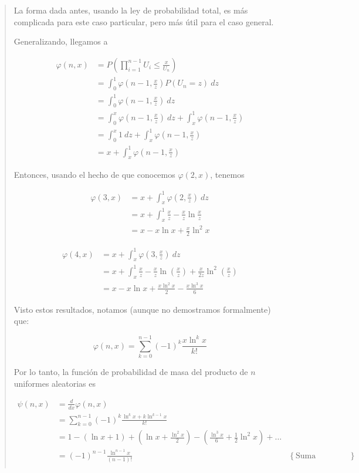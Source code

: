 \documentclass[a4paper, 12pt]{article}
\begin{document}
\begin{quote}
\begin{myframe}
La forma dada antes, usando la ley de probabilidad total, es más complicada para
este caso particular, pero más útil para el caso general.
\end{myframe}

Generalizando, llegamos a

\begin{align*}
  \varphi(n, x) 
  &= P\left(\prod_{i=1}^{n-1} U_i \leq \frac{x}{U_n}\right)  \\ 
  &= \int_0^1 \varphi\left(n-1, \frac{x}{z}\right) P(U_n = z) ~ dz \\ 
  &=\int_0^1 \varphi\left(n-1, \frac{x}{z}\right) ~ dz \\ 
  &=\int_0^x \varphi \left( n - 1, \frac{x}{z} \right) ~ dz + \int_x^1 \varphi
  \left( n - 1, \frac{x}{z} \right) \\ 
  &= \int_0^x 1 ~ dz + \int_x^{1} \varphi\left( n-1, \frac{x}{z} \right)  \\ 
  &= x + \int_x^1 \varphi\left( n-1, \frac{x}{z} \right) 
\end{align*}

Entonces, usando el hecho de que conocemos $\varphi(2, x)$, tenemos 

\begin{align*}
  \varphi(3, x) 
  &= x + \int_x^1 \varphi(2, \frac{x}{z}) ~ dz  \\ 
  &=x + \int_x^1 \frac{x}{z}-\frac{x}{z} \ln \frac{x}{z} \\ 
  &= x - x\ln x + \frac{x}{2} \ln^2 x
\end{align*}

\begin{align*}
  \varphi(4, x) 
  &= x + \int_x^1 \varphi(3, \frac{x}{z}) ~ dz  \\ 
  &=
  x + \int_x^1 \frac{x}{z} -\frac{x}{z} \ln\left( \frac{x}{z} \right) + \frac{x}{2z} \ln^2 \left( \frac{x}{z} \right)   \\ 
  &=x - x \ln x + \frac{x \ln^2 x}{2} - \frac{x \ln^3 x}{6}
\end{align*}

Visto estos resultados, notamos (aunque no demostramos formalmente) que:

\begin{equation*}
  \varphi(n, x) = \sum_{k=0}^{n-1} \left( -1 \right)^{k} \frac{x \ln^k x}{k!}
\end{equation*}

Por lo tanto, la función de probabilidad de masa del producto de $n$ uniformes
aleatorias es 

\begin{align*}
  \psi(n, x) 
  &= \frac{d}{dx} \varphi(n, x) \\
  &= \sum_{k=0}^{n-1}(-1)^{k} 
  \frac{\ln^k x + k \ln^{k-1} x}{k!}  \\ 
  &=1 - (\ln x + 1) + \left(\ln x + \frac{ \ln^2 x }{2}\right) -
  \left( \frac{\ln^3 x}{6} + \frac{1}{2}\ln^2 x \right)  + \ldots \\ 
  &= (-1)^{n-1} \frac{\ln^{n-1} x}{(n-1)!}  &\left\{ \text{Suma telescópica} \right\} \\ 
\end{align*}


\end{quote}
\end{document}
